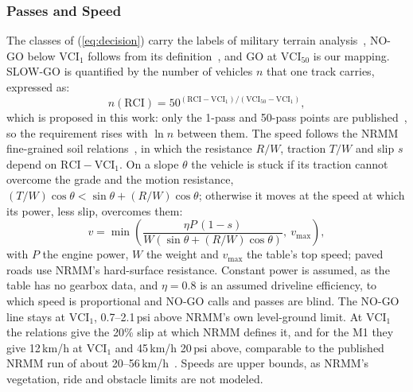 \documentclass[conference]{IEEEtran}
\begin{document}
\subsubsection{Passes and Speed}
The classes of (\ref{eq:decision}) carry the labels of military terrain analysis~\cite{khan2021}, NO-GO below
$\mathrm{VCI}_1$ follows from its definition~\cite{rula1971}, and GO at $\mathrm{VCI}_{50}$ is our
mapping. SLOW-GO is quantified by the number of vehicles $n$ that one track carries, expressed as:
\begin{equation}
  n(\mathrm{RCI}) = 50^{(\mathrm{RCI} - \mathrm{VCI}_1)/(\mathrm{VCI}_{50} - \mathrm{VCI}_1)},
  \label{eq:passes}
\end{equation}
which is proposed in this work: only the 1-pass and 50-pass points are published~\cite{rula1971}, so the
requirement rises with $\ln n$ between them. The speed follows the NRMM fine-grained soil
relations~\cite{haley1979}, in which the resistance $R/W$, traction $T/W$ and slip $s$ depend on
$\mathrm{RCI} - \mathrm{VCI}_1$. On a slope $\theta$ the vehicle is stuck if its
traction cannot overcome the grade and the motion resistance,
$(T/W)\cos\theta < \sin\theta + (R/W)\cos\theta$; otherwise it moves at the speed at which its
power, less slip, overcomes them:
\begin{equation}
  v = \min\!\left(\frac{\eta P\,(1 - s)}{W\left(\sin\theta + (R/W)\cos\theta\right)},\ v_{\max}\right),
  \label{eq:speed}
\end{equation}
with $P$ the engine power, $W$ the weight and $v_{\max}$ the table's top speed; paved roads use
NRMM's hard-surface resistance. Constant power is assumed, as the table has no gearbox data, and
$\eta = 0.8$ is an assumed driveline efficiency, to which speed is proportional and NO-GO calls
and passes are blind. The NO-GO line stays at $\mathrm{VCI}_1$, 0.7--2.1\,psi above NRMM's own
level-ground limit. At $\mathrm{VCI}_1$ the relations give the 20\% slip at which NRMM defines it,
and for the M1 they give 12\,km/h at $\mathrm{VCI}_1$ and 45\,km/h 20\,psi above, comparable to the
published NRMM run of about 20--56\,km/h~\cite{ciobotaru2009}. Speeds are upper bounds, as NRMM's
vegetation, ride and obstacle limits are not modeled.
\end{document}
